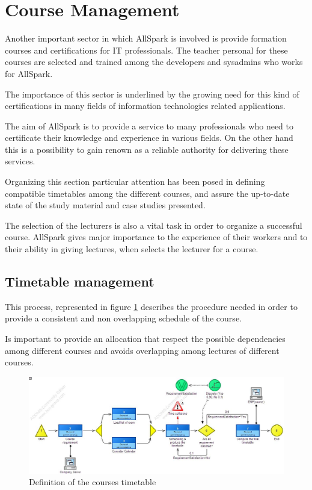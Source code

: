 \section{Course Management}
Another important sector in which AllSpark is involved is provide formation
courses and certifications for IT professionals. The teacher personal for
these courses are selected and trained among the developers and sysadmins
who works for AllSpark. 

The importance of this sector is underlined by the growing need for this
kind of certifications in many fields of information technologies related
applications.

The aim of AllSpark is to provide a service to many professionals who need
to certificate their knowledge and experience in various fields. On the
other hand this is a possibility to gain renown as a reliable authority for
delivering these services.

Organizing this section particular attention has been posed in defining
compatible timetables among the different courses, and assure the
up-to-date state of the study material and case studies presented.

The selection of the lecturers is also a vital task in order to organize a
successful course. AllSpark gives major importance to the experience of
their workers and to their ability in giving lectures, when selects the
lecturer for a course.

\subsection{Timetable management}
This process, represented in figure \ref{2img:timetable}  describes the
procedure needed in order to provide a consistent and non overlapping
schedule of the course.

Is important to provide an allocation that respect the possible
dependencies among different courses and avoids overlapping among lectures
of different courses.

\begin{figure}[!ht]
\centering
\includegraphics[scale=0.50,angle=90]{assign2/adonis/imgs/timetable.jpg}
\caption{Definition of the courses timetable}
\label{2img:timetable}
\end{figure}

